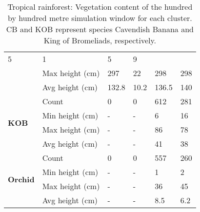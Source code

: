 \begin{table}[]
\begin{tabular}{|p{2cm}|p{2cm}|p{2cm}|p{2cm}|p{2cm}|p{2cm}|}
						\multicolumn{1}{l|}{5} & 
						\multicolumn{1}{l|}{1} &
						\multicolumn{1}{l|}{5} & 
						\multicolumn{1}{l|}{9} \\\cline{2-6} &
						\multicolumn{1}{l|}{Max height (cm)} & 
						\multicolumn{1}{l|}{297} & 
						\multicolumn{1}{l|}{22} &
						\multicolumn{1}{l|}{298} & 
						\multicolumn{1}{l|}{298} \\\cline{2-6} &
						\multicolumn{1}{l|}{Avg height (cm)} & 
						\multicolumn{1}{l|}{132.8} & 
						\multicolumn{1}{l|}{10.2} &
						\multicolumn{1}{l|}{136.5} & 
						\multicolumn{1}{l|}{140} \\\cline{2-6}
		\hline      
		\multirow{4}{*}{\textbf{KOB}} & 
						\multicolumn{1}{l|}{Count} & 
						\multicolumn{1}{l|}{0} & 
						\multicolumn{1}{l|}{0} &
						\multicolumn{1}{l|}{612} & 
						\multicolumn{1}{l|}{281} \\\cline{2-6} &
						\multicolumn{1}{l|}{Min height (cm)} & 
						\multicolumn{1}{l|}{-} & 
						\multicolumn{1}{l|}{-} &
						\multicolumn{1}{l|}{6} & 
						\multicolumn{1}{l|}{16} \\\cline{2-6} &
						\multicolumn{1}{l|}{Max height (cm)} & 
						\multicolumn{1}{l|}{-} & 
						\multicolumn{1}{l|}{-} &
						\multicolumn{1}{l|}{86} & 
						\multicolumn{1}{l|}{78} \\\cline{2-6} &
						\multicolumn{1}{l|}{Avg height (cm)} & 
						\multicolumn{1}{l|}{-} & 
						\multicolumn{1}{l|}{-} &
						\multicolumn{1}{l|}{41} & 
						\multicolumn{1}{l|}{38} \\\cline{2-6}
		\hline     
		\multirow{4}{*}{\textbf{Orchid}} & 
						\multicolumn{1}{l|}{Count} & 
						\multicolumn{1}{l|}{0} & 
						\multicolumn{1}{l|}{0} &
						\multicolumn{1}{l|}{557} & 
						\multicolumn{1}{l|}{260} \\\cline{2-6} &
						\multicolumn{1}{l|}{Min height (cm)} & 
						\multicolumn{1}{l|}{-} & 
						\multicolumn{1}{l|}{-} &
						\multicolumn{1}{l|}{1} & 
						\multicolumn{1}{l|}{2} \\\cline{2-6} &
						\multicolumn{1}{l|}{Max height (cm)} & 
						\multicolumn{1}{l|}{-} & 
						\multicolumn{1}{l|}{-} &
						\multicolumn{1}{l|}{36} & 
						\multicolumn{1}{l|}{45} \\\cline{2-6} &
						\multicolumn{1}{l|}{Avg height (cm)} & 
						\multicolumn{1}{l|}{-} & 
						\multicolumn{1}{l|}{-} &
						\multicolumn{1}{l|}{8.5} & 
						\multicolumn{1}{l|}{6.2} \\\cline{2-6}
		\hline                                                       
		\end{tabular}
	\label{tab:results_tropical_species_cluster_properties}	
	\caption{Tropical rainforest: Vegetation content of the hundred by hundred metre simulation window for each cluster. CB and KOB represent species Cavendish Banana and King of Bromeliads, respectively.}
\end{table}

